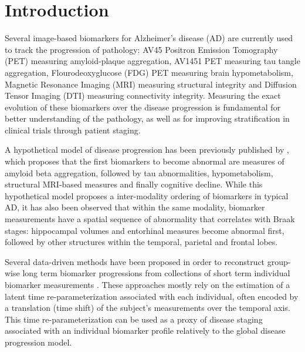 \documentclass{llncs}
\begin{document}
\section{Introduction}


Several image-based biomarkers for Alzheimer's disease (AD) are currently used to track the progression of pathology: AV45 Positron Emission Tomography (PET) measuring amyloid-plaque aggregation, AV1451 PET measuring tau tangle aggregation, Flourodeoxyglucose (FDG) PET measuring brain hypometabolism, Magnetic Resonance Imaging (MRI) measuring structural integrity and Diffusion Tensor Imaging (DTI) measuring connectivity integrity. Measuring the exact evolution of these biomarkers over the disease progression is fundamental for better understanding of the pathology, as well as for improving stratification in clinical trials through patient staging.

A hypothetical model of disease progression has been previously published by \cite{jack2010hypothetical}, which proposes that the first biomarkers to become abnormal are measures of amyloid beta aggregation, followed by tau abnormalities, hypometabolism, structural MRI-based measures and finally cognitive decline. While this hypothetical model proposes a inter-modality ordering of biomarkers in typical AD, it has also been observed that within the same modality, biomarker measurements have a spatial sequence of abnormality that correlates with Braak stages: hippocampal volumes and entorhinal measures become abnormal first, followed by other structures within the temporal, parietal and frontal lobes.

Several data-driven methods have been proposed in order to reconstruct group-wise long term biomarker progressions from collections of short term individual biomarker measurements \cite{lorenzi2017disease,oxtoby2018}. These approaches mostly rely on the estimation of a latent time re-parameterization associated with each individual, often encoded by a translation (time shift) of the subject's measurements over the temporal axis.  This time re-parameterization can be used as a proxy of disease staging associated with an individual biomarker profile relatively to the global disease progression model. 
\end{document}
